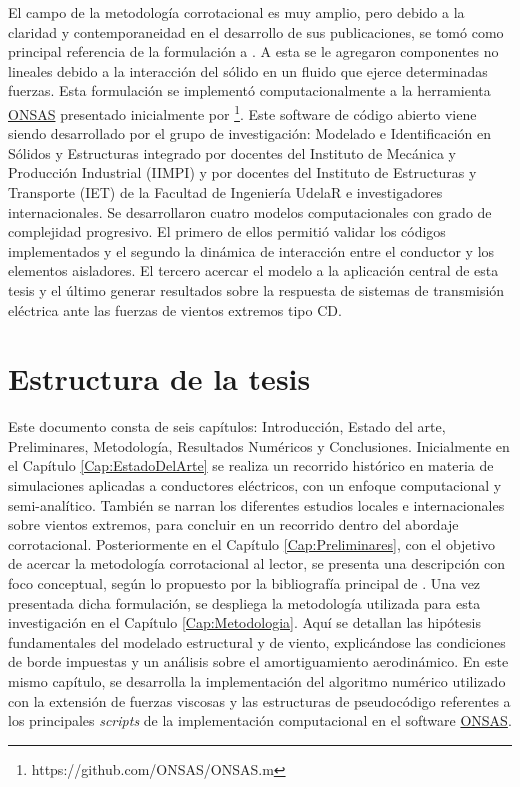El campo de la metodología corrotacional es muy amplio, pero debido a la claridad y contemporaneidad en el desarrollo de sus publicaciones, se tomó como principal referencia de la formulación a \cite{Le2014}. A esta se le agregaron componentes no lineales debido a la interacción del sólido en un fluido que ejerce determinadas fuerzas. Esta formulación se implementó computacionalmente a la herramienta \href{https://github.com/ONSAS/ONSAS.m}{ONSAS} presentado inicialmente por \cite{bruno2017introduccion} \footnote{https://github.com/ONSAS/ONSAS.m}. Este software de código abierto viene siendo desarrollado por el grupo de investigación: Modelado e Identificación en Sólidos y Estructuras integrado por docentes del Instituto de Mecánica y Producción Industrial (IIMPI) y por docentes del Instituto de Estructuras y Transporte (IET) de la Facultad de Ingeniería UdelaR e investigadores internacionales. Se desarrollaron cuatro modelos computacionales con grado de complejidad progresivo. El primero de ellos permitió validar los códigos implementados y el segundo la dinámica de interacción entre el conductor y los elementos aisladores. El tercero acercar el modelo a la aplicación central de esta tesis y el último generar resultados sobre la respuesta de sistemas de transmisión eléctrica ante las fuerzas de vientos extremos tipo CD.




\section{Estructura de la tesis}

Este documento consta de seis capítulos: Introducción, Estado del arte, Preliminares, Metodología, Resultados Numéricos y Conclusiones. Inicialmente en el Capítulo \ref{Cap:EstadoDelArte} se realiza un recorrido histórico en materia de simulaciones aplicadas a conductores eléctricos, con un enfoque computacional y semi-analítico. También se narran los diferentes estudios locales e internacionales sobre vientos extremos, para concluir en un recorrido dentro del abordaje corrotacional. Posteriormente en el Capítulo \ref{Cap:Preliminares}, con el objetivo de acercar la metodología corrotacional al lector, se presenta una descripción con foco conceptual, según lo propuesto por la bibliografía principal de \citet{Le2014}. Una vez presentada dicha formulación, se despliega la metodología utilizada para esta investigación en el Capítulo \ref{Cap:Metodologia}. Aquí se detallan las hipótesis fundamentales del modelado estructural y de viento, explicándose las condiciones de borde impuestas y un análisis sobre el amortiguamiento aerodinámico. En este mismo capítulo, se desarrolla la implementación del algoritmo numérico utilizado con la extensión de fuerzas viscosas y las estructuras de pseudocódigo referentes a los principales \textit{scripts} de la implementación computacional en el software \href{https://github.com/ONSAS/ONSAS/}{ONSAS}. 


